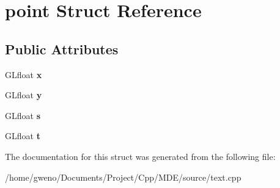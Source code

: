 \hypertarget{structpoint}{}\section{point Struct Reference}
\label{structpoint}
\subsection*{Public Attributes}
\begin{DoxyCompactItemize}
\item 
G\+Lfloat {\bfseries x}\hypertarget{structpoint_a1b897e15553a9e09f9c1f23c08772e7d}{}\label{structpoint_a1b897e15553a9e09f9c1f23c08772e7d}

\item 
G\+Lfloat {\bfseries y}\hypertarget{structpoint_a69a95a7bade398cc34ba8e4bfd579132}{}\label{structpoint_a69a95a7bade398cc34ba8e4bfd579132}

\item 
G\+Lfloat {\bfseries s}\hypertarget{structpoint_a6ad5eb285e764443e9b9d84911d3ed8c}{}\label{structpoint_a6ad5eb285e764443e9b9d84911d3ed8c}

\item 
G\+Lfloat {\bfseries t}\hypertarget{structpoint_a77d3307ea9c59b3df6001703ea2f1582}{}\label{structpoint_a77d3307ea9c59b3df6001703ea2f1582}

\end{DoxyCompactItemize}


The documentation for this struct was generated from the following file\+:\begin{DoxyCompactItemize}
\item 
/home/gweno/\+Documents/\+Project/\+Cpp/\+M\+D\+E/source/text.\+cpp\end{DoxyCompactItemize}
